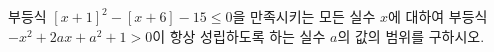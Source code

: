 부등식 $[x+1]^2-[x+6]-15\le 0$을 만족시키는 모든 실수 $x$에 대하여 부등식 $-x^2+2ax+a^2+1>0$이 항상 성립하도록 하는 실수 $a$의 값의 범위를 구하시오. 
